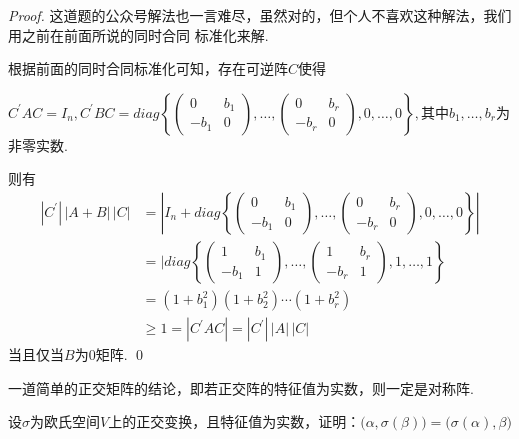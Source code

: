 \begin{proof}
	这道题的公众号解法也一言难尽，虽然对的，但个人不喜欢这种解法，我们用之前在前面所说的同时合同
	标准化来解.

	根据前面的同时合同标准化可知，存在可逆阵$C$使得
	
	$C^\prime A C = I_n, C^\prime B C = diag\left\{ \begin{pmatrix}
		0 & b_1 \\
		-b_1 & 0
	\end{pmatrix}, \dots, \begin{pmatrix}
		0 & b_r \\
		-b_r & 0
	\end{pmatrix},0,\dots, 0\right\},$其中$b_1,\dots,b_r$为非零实数.

	则有
	\begin{align*}
		|C^\prime | \, |A+B| \, |C| &= |I_n +  diag\left\{ \begin{pmatrix}
			0 & b_1 \\
			-b_1 & 0
		\end{pmatrix}, \dots, \begin{pmatrix}
			0 & b_r \\
			-b_r & 0
		\end{pmatrix},0,\dots, 0\right\}| \\
		&= | diag \left\{ \begin{pmatrix}
			1 & b_1 \\
			-b_1 & 1
		\end{pmatrix}, \dots, \begin{pmatrix}
			1 & b_r \\
			-b_r & 1
		\end{pmatrix},1,\dots, 1 \right\} \\
		&= (1+b_1^2)(1+b_2^2)\cdots (1+b_r^2) \\
		&\geq 1 = |C^\prime A C | = | C^\prime | \, |A| \, |C|
	\end{align*}
	当且仅当$B$为0矩阵.
	\qed{}
\end{proof}

一道简单的正交矩阵的结论，即若正交阵的特征值为实数，则一定是对称阵.

\begin{ex}[华中2021]
	设$\sigma$为欧氏空间$V$上的正交变换，且特征值为实数，证明：$\bigl( \alpha, \sigma(\beta) \bigr)
	=\bigl( \sigma(\alpha), \beta \bigr)$
\end{ex}

